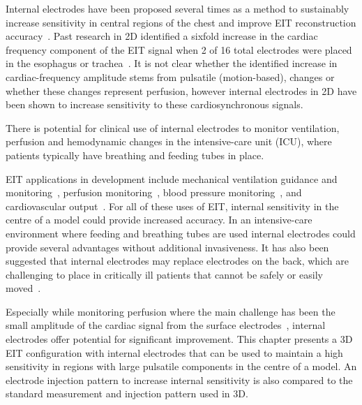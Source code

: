 Internal electrodes have been proposed several times as a method to 
sustainably increase sensitivity in central regions of the 
chest and improve EIT reconstruction 
accuracy~\parencite{pilkington_utilization_1989,schuessler_utility_1995,nasehi_tehrani_evaluation_2012, 
czaplik_application_2014,nguyen_electrical_2020}.
Past research in 2D identified a sixfold increase in the cardiac frequency 
component of the EIT signal 
when 2 of 16 total electrodes were placed in the 
esophagus or trachea~\parencite{czaplik_application_2014}. It is not clear whether 
the identified increase in cardiac-frequency amplitude stems from pulsatile 
(motion-based), changes or whether these changes represent 
perfusion, however internal electrodes in 2D have been shown to increase sensitivity
to these cardiosynchronous signals. 

There is potential for clinical use of internal electrodes 
to monitor ventilation, perfusion and 
hemodynamic changes in the 
intensive-care unit (ICU), where patients typically have
breathing and feeding tubes in place.

EIT applications in development include mechanical ventilation 
guidance and monitoring~\parencite{frerichs_chest_2017}, perfusion 
monitoring~\parencite{frerichs_regional_2002,smit_electrical_2003}, 
blood pressure monitoring~\parencite{sola_non-invasive_2011,proenca_noninvasive_2017}, 
and cardiovascular output~\parencite{braun_accuracy_2018}. 
For all of these uses of EIT, internal sensitivity in the centre of 
a model could provide increased accuracy. In an 
intensive-care environment where feeding and breathing tubes 
are used internal electrodes could provide 
several advantages without additional invasiveness. 
It has also been suggested that internal electrodes may replace 
electrodes on the back, which are challenging to place in critically 
ill patients that cannot be safely or easily 
moved~\parencite{czaplik_application_2014}.

Especially while monitoring perfusion where the main challenge
has been the small amplitude of the cardiac signal from the surface 
electrodes~\parencite{nguyen_review_2012}, internal electrodes offer
potential for significant improvement.
This chapter presents a 3D EIT configuration with internal electrodes
that can be used to maintain a high sensitivity in regions with 
large pulsatile components in the centre of a model.
An electrode injection pattern to increase
internal sensitivity is also compared to the standard 
measurement and injection pattern used in 3D.

